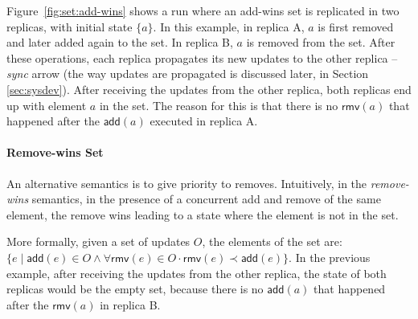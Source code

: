 \documentclass[11pt,a4paper]{article}
\def\land{\mathrel{\wedge}}
\begin{document}

Figure~\ref{fig:set:add-wins} shows a run where an add-wins set is replicated
in two replicas, with initial state $\{a\}$. 
In this example, in replica A, $a$ is first removed and later added again to 
the set. In replica B, $a$ is removed from the set.
After these operations, each replica propagates its new updates to the other replica 
-- \emph{sync} arrow (the way updates are propagated is discussed later, in 
Section \ref{sec:sysdev}).
After receiving the updates from the other replica, both replicas end up 
with element $a$ in the set. The reason for this is that there is no
$\mathsf{rmv}(a)$ that happened after the $\mathsf{add}(a)$ executed in replica A.

\paragraph{Remove-wins Set}
An alternative semantics is to give priority to removes.
Intuitively, in the \emph{remove-wins} semantics, 
in the presence of a concurrent add and remove of the same element, the 
remove wins leading to a state where the element is not in the set.

More formally, given a set of updates $O$, the elements of the set 
are:
$\{e \mid \mathsf{add}(e) \in O \land \forall \mathsf{rmv}(e) \in O \cdot  \mathsf{rmv}(e) \prec \mathsf{add}(e)\}$.
In the previous example, after receiving the updates from the other replica, 
the state of both replicas 
would be the empty set, because there is no $\mathsf{add}(a)$ that happened after the
$\mathsf{rmv}(a)$ in replica B.
\end{document}
